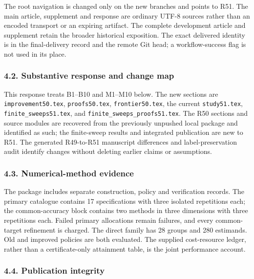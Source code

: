 \documentclass[ecta,nameyear,draft]{econsocart}
\begin{document}
The root navigation is changed only on the new branches and points to
R51. The main article, supplement and response are ordinary UTF-8
sources rather than an encoded transport or an expiring artifact. The
complete development article and supplement retain the broader
historical exposition. The exact delivered identity is in the
final-delivery record and the remote Git head; a workflow-success flag
is not used in its place.

\hypertarget{substantive-response-and-change-map}{%
\subsubsection{4.2. Substantive response and change
map}\label{substantive-response-and-change-map}}

This response treats B1--B10 and M1--M10 below. The new sections are
\nolinkurl{improvement50.tex}, \nolinkurl{proofs50.tex},
\nolinkurl{frontier50.tex}, the current \nolinkurl{study51.tex},
\nolinkurl{finite_sweeps51.tex}, and
\nolinkurl{finite_sweeps_proofs51.tex}. The R50 sections and source
modules are recovered from the previously unpushed local package and
identified as such; the finite-sweep results and integrated publication
are new to R51. The generated R49-to-R51 manuscript differences and
label-preservation audit identify changes without deleting earlier
claims or assumptions.

\hypertarget{numerical-method-evidence}{%
\subsubsection{4.3. Numerical-method
evidence}\label{numerical-method-evidence}}

The package includes separate construction, policy and verification
records. The primary catalogue contains 17 specifications with three
isolated repetitions each; the common-accuracy block contains two
methods in three dimensions with three repetitions each. Failed primary
allocations remain failures, and every common-target refinement is
charged. The direct family has 28 groups and 280 estimands. Old and
improved policies are both evaluated. The supplied cost-resource ledger,
rather than a certificate-only attainment table, is the joint
performance account.

\hypertarget{publication-integrity}{%
\subsubsection{4.4. Publication integrity}\label{publication-integrity}}
\end{document}

